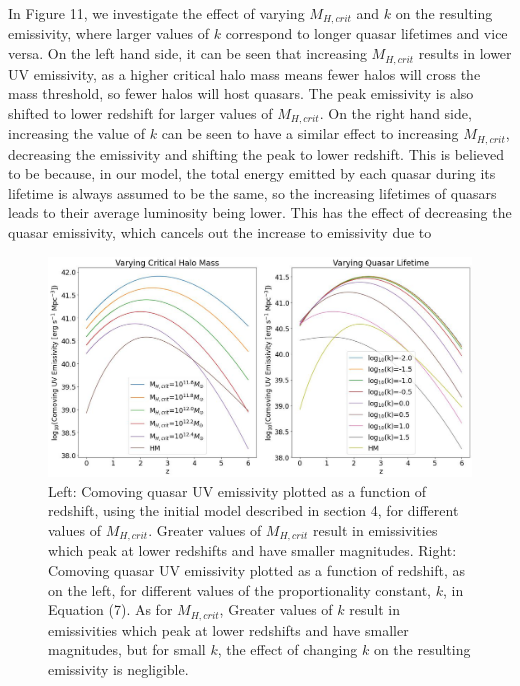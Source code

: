 \documentclass[12pt, twocolumn]{report}%
\begin{document}
In Figure 11, we investigate the effect of varying $M_{H,crit}$ and $k$ on the resulting emissivity, where larger values of $k$ correspond to longer quasar lifetimes and vice versa. On the left hand side, it can be seen that increasing $M_{H,crit}$ results in lower UV emissivity, as a higher critical halo mass means fewer halos will cross the mass threshold, so fewer halos will host quasars. The peak emissivity is also shifted to lower redshift for larger values of $M_{H,crit}$. On the right hand side, increasing the value of $k$ can be seen to have a similar effect to increasing $M_{H,crit}$, decreasing the emissivity and shifting the peak to lower redshift. This is believed to be because, in our model, the total energy emitted by each quasar during its lifetime is always assumed to be the same, so the increasing lifetimes of quasars leads to their average luminosity being lower. This has the effect of decreasing the quasar emissivity, which cancels out the increase to emissivity due to

\onecolumngrid


 \begin{figure}[H]
     \centering
     \includegraphics[width=\linewidth]{Plot_9.jpeg}
     \caption{Left: Comoving quasar UV emissivity plotted as a function of redshift, using the initial model described in section 4, for different values of $M_{H,crit}$. Greater values of $M_{H,crit}$ result in emissivities which peak at lower redshifts and have smaller magnitudes. Right: Comoving quasar UV emissivity plotted as a function of redshift, as on the left, for different values of the proportionality constant, $k$, in Equation (7). As for $M_{H,crit}$, Greater values of $k$ result in emissivities which peak at lower redshifts and have smaller magnitudes, but for small $k$, the effect of changing $k$ on the resulting emissivity is negligible.}
     \label{fig:11}
 \end{figure}
\end{document}
